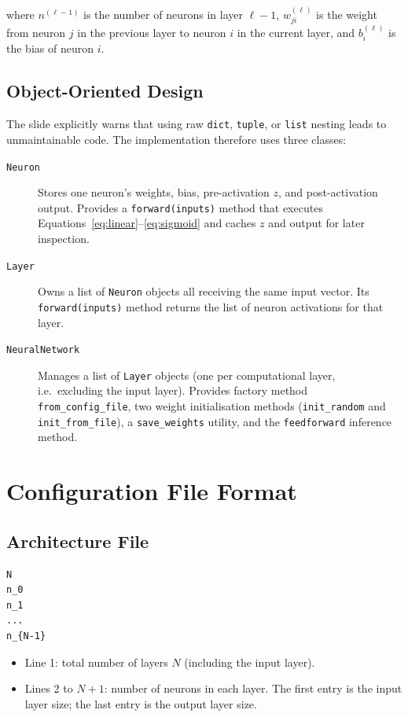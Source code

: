 \documentclass[12pt,a4paper]{article}
\begin{document}
where $n^{(\ell-1)}$ is the number of neurons in layer $\ell - 1$,
$w_{ji}^{(\ell)}$ is the weight from neuron $j$ in the previous layer to
neuron $i$ in the current layer, and $b_i^{(\ell)}$ is the bias of neuron $i$.

\subsection{Object-Oriented Design}

The slide explicitly warns that using raw \texttt{dict}, \texttt{tuple}, or
\texttt{list} nesting leads to unmaintainable code.
The implementation therefore uses three classes:

\begin{description}
    \item[\texttt{Neuron}] Stores one neuron's weights, bias, pre-activation
          $z$, and post-activation output.
          Provides a \texttt{forward(inputs)} method that executes
          Equations~\eqref{eq:linear}--\eqref{eq:sigmoid} and caches $z$ and
          output for later inspection.
    \item[\texttt{Layer}] Owns a list of \texttt{Neuron} objects all receiving
          the same input vector.
          Its \texttt{forward(inputs)} method returns the list of neuron
          activations for that layer.
    \item[\texttt{NeuralNetwork}] Manages a list of \texttt{Layer} objects
          (one per computational layer, i.e.\ excluding the input layer).
          Provides factory method \texttt{from\_config\_file}, two weight
          initialisation methods (\texttt{init\_random} and
          \texttt{init\_from\_file}), a \texttt{save\_weights} utility, and
          the \texttt{feedforward} inference method.
\end{description}

\section{Configuration File Format}

\subsection{Architecture File}

\begin{verbatim}
N
n_0
n_1
...
n_{N-1}
\end{verbatim}

\begin{itemize}
    \item Line 1: total number of layers $N$ (including the input layer).
    \item Lines 2 to $N{+}1$: number of neurons in each layer.
          The first entry is the input layer size; the last entry is the
          output layer size.
\end{itemize}
\end{document}
